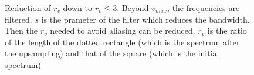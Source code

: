 		
		\begin{figure}
		\centering
		\caption{Reduction of $r_v$ down to $r_v \leq 3$. Beyond $v_{max}$, the frequencies are filtered. $s$ is the prameter of the filter which reduces the bandwidth. Then the $r_v$ needed to avoid aliasing can be reduced. $r_v$ is the ratio of the length of the dotted rectangle (which is the spectrum after the upsampling) and that of the square (which is the initial spectrum)}
		\label{rvleq3}
		\end{figure}


